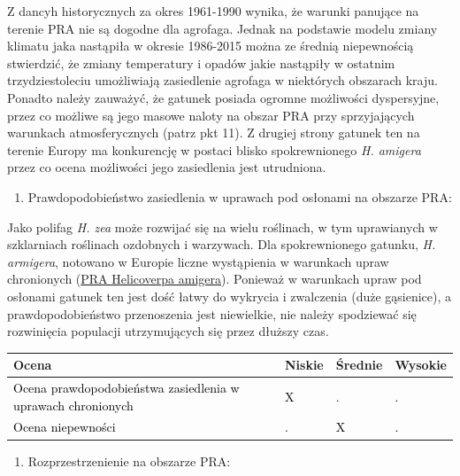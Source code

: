 \documentclass[polish,a4paper]{article}
\providecommand{\tightlist}{%
  \setlength{\itemsep}{0pt}\setlength{\parskip}{0pt}}
\begin{document}
Z dancyh historycznych za okres 1961-1990 wynika, że warunki panujące na
terenie PRA nie są dogodne dla agrofaga. Jednak na podstawie modelu
zmiany klimatu jaka nastąpiła w okresie 1986-2015 można ze średnią
niepewnością stwierdzić, że zmiany temperatury i opadów jakie nastąpiły
w ostatnim trzydziestoleciu umożliwiają zasiedlenie agrofaga w
niektórych obszarach kraju. Ponadto należy zauważyć, że gatunek posiada
ogromne możliwości dyspersyjne, przez co możliwe są jego masowe naloty
na obszar PRA przy sprzyjających warunkach atmosferycznych (patrz pkt
11). Z drugiej strony gatunek ten na terenie Europy ma konkurencję w
postaci blisko spokrewnionego \emph{H. amigera} przez co ocena
możliwości jego zasiedlenia jest utrudniona.

\begin{enumerate}
\def\labelenumi{(\arabic{enumi})}
\setcounter{enumi}{9}
\tightlist
\item
  Prawdopodobieństwo zasiedlenia w uprawach pod osłonami na obszarze
  PRA:
\end{enumerate}

Jako polifag \emph{H. zea} może rozwijać się na wielu roślinach, w tym
uprawianych w szklarniach roślinach ozdobnych i warzywach. Dla
spokrewnionego gatunku, \emph{H. armigera}, notowano w Europie liczne
wystąpienia w warunkach upraw chronionych
(\href{https://secure.fera.defra.gov.uk/phiw/riskRegister/downloadExternalPra.cfm?id=3879}{PRA
Helicoverpa amigera}). Ponieważ w warunkach upraw pod osłonami gatunek
ten jest dość łatwy do wykrycia i zwalczenia (duże gąsienice), a
prawdopodobieństwo przenoszenia jest niewielkie, nie należy spodziewać
się rozwinięcia populacji utrzymujących się przez dłuższy czas.

\begin{tabu} to 
\toprule
{}  \textbf{Ocena} & \textbf{Niskie} & \textbf{Średnie} & \textbf{Wysokie}\\
\midrule
{}  \textcolor{black}{Ocena prawdopodobieństwa zasiedlenia w uprawach chronionych} & \textcolor{black}{X} & \textcolor{black}{.} & \textcolor{black}{.}\\
  \textcolor{black}{Ocena niepewności} & \textcolor{black}{.} & \textcolor{black}{X} & \textcolor{black}{.}\\
\bottomrule
\end{tabu}

\begin{enumerate}
\def\labelenumi{(\arabic{enumi})}
\setcounter{enumi}{10}
\tightlist
\item
  Rozprzestrzenienie na obszarze PRA:
\end{enumerate}
\end{document}

